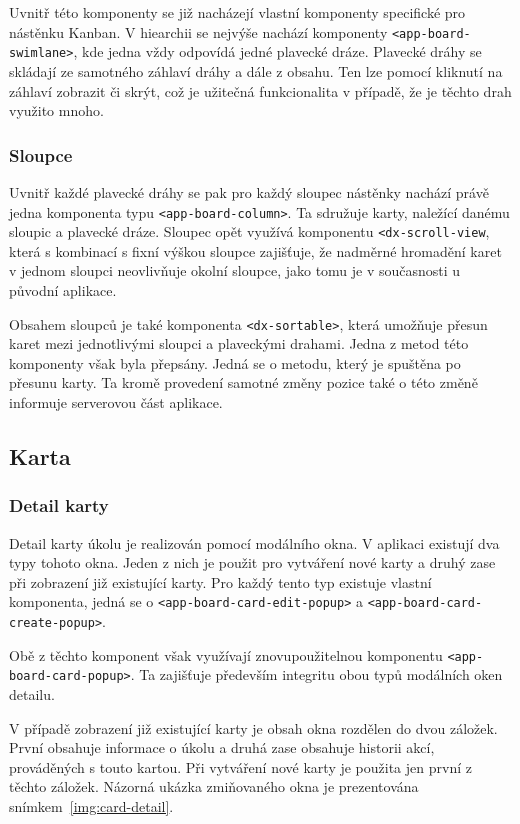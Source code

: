 Uvnitř této komponenty se již nacházejí vlastní komponenty specifické pro nástěnku Kanban. V hiearchii se nejvýše nachází komponenty \texttt{<app-board-swimlane>}, kde jedna vždy odpovídá jedné plavecké dráze. Plavecké dráhy se skládají ze samotného záhlaví dráhy a dále z obsahu. Ten lze pomocí kliknutí na záhlaví zobrazit či skrýt, což je užitečná funkcionalita v případě, že je těchto drah využito mnoho. 

\subsubsection*{Sloupce}

Uvnitř každé plavecké dráhy se pak pro každý sloupec nástěnky nachází právě jedna komponenta typu \texttt{<app-board-column>}. Ta sdružuje karty, naležící danému sloupic a plavecké dráze. Sloupec opět využívá komponentu \texttt{<dx-scroll-view}, která s kombinací s fixní výškou sloupce zajišťuje, že nadměrné hromadění karet v jednom sloupci neovlivňuje okolní sloupce, jako tomu je v současnosti u původní aplikace.

Obsahem sloupců je také komponenta \texttt{<dx-sortable>}, která umožňuje přesun karet mezi jednotlivými sloupci a plaveckými drahami. Jedna z metod této komponenty však byla přepsány. Jedná se o metodu, který je spuštěna po přesunu karty. Ta kromě provedení samotné změny pozice také o této změně informuje serverovou část aplikace. 

\subsection{Karta}

\blindtext

\subsubsection*{Detail karty}
Detail karty úkolu je realizován pomocí modálního okna. V aplikaci existují dva typy tohoto okna. Jeden z nich je použit pro vytváření nové karty a druhý zase při zobrazení již existující karty. Pro každý tento typ existuje vlastní komponenta, jedná se o \texttt{<app-board-card-edit-popup>} a \texttt{<app-board-card-create-popup>}.

Obě z těchto komponent však využívají znovupoužitelnou komponentu \texttt{<app-board-card-popup>}. Ta zajišťuje především integritu obou typů modálních oken detailu.

V případě zobrazení již existující karty je obsah okna rozdělen do dvou záložek. První obsahuje informace o úkolu a druhá zase obsahuje historii akcí, prováděných s touto kartou. Při vytváření nové karty je použita jen první z těchto záložek. Názorná ukázka zmiňovaného okna je prezentována snímkem~\ref{img:card-detail}.

